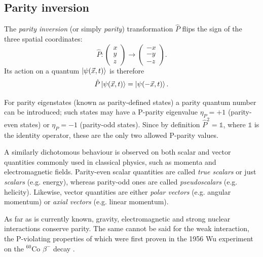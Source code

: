 \subsection{Parity inversion}
The \textit{parity inversion} (or simply \textit{parity}) transformation $\hat{P}$ flips the sign of the three spatial coordinates:
\begin{equation}
	\hat{P} : \begin{pmatrix}
		x \\ y \\ z
	\end{pmatrix}
	\rightarrow
	\begin{pmatrix}
		-x \\ -y \\ -z
	\end{pmatrix}.
\end{equation}
Its action on a quantum $\ket{\psi(\vec{x},t)}$ is therefore
\begin{equation}
	\hat{P} \ket{\psi(\vec{x},t)} = \ket{\psi(-\vec{x},t)}.
\end{equation}

For parity eigenstates (known as parity-defined states) a parity quantum number can be introduced;
such states may have a P-parity eigenvalue $\eta_P = +1$ (parity-even states) or $\eta_P = -1$ (parity-odd states).
Since by definition $\hat{P}^2 = \mathds{1}$, where $\mathds{1}$ is the identity operator, these are the only two allowed P-parity values.

A similarly dichotomous behaviour is observed on both scalar and vector quantities commonly used in classical physics, such as momenta and electromagnetic fields.
Parity-even scalar quantities are called \textit{true scalars} or just \textit{scalars} (e.g. energy), whereas parity-odd ones are called \textit{pseudoscalars} (e.g. helicity).
Likewise, vector quantities are either \textit{polar vectors} (e.g. angular momentum) or \textit{axial vectors} (e.g. linear momentum).

As far as is currently known, gravity, electromagnetic and strong nuclear interactions conserve parity.
The same cannot be said for the weak interaction, the P-violating properties of which were first proven in the 1956 Wu experiment on the $^{60}\text{Co}$ $\beta^-$ decay \cite{wu}. 

